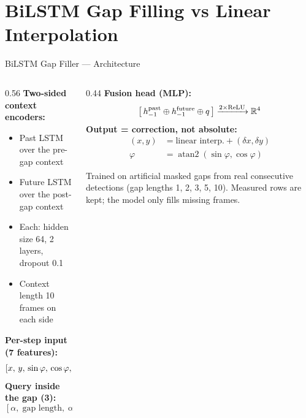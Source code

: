 
\section[BiLSTM Gap Filling]{BiLSTM Gap Filling vs Linear Interpolation}

\begin{frame}{BiLSTM Gap Filler --- Architecture}
\begin{columns}
\begin{column}{0.56\textwidth}
\textbf{Two-sided context encoders:}
\begin{itemize}\small
    \item Past LSTM over the pre-gap context
    \item Future LSTM over the post-gap context
    \item Each: hidden size 64, 2 layers, dropout 0.1
    \item Context length 10 frames on each side
\end{itemize}
\smallskip
\textbf{Per-step input (7 features):}
\begingroup\footnotesize
\begin{equation*}
    \left[x,\, y,\, \sin\varphi,\, \cos\varphi,\, \Delta x_{\rm prev},\, \Delta y_{\rm prev},\, \Delta t\right]
\end{equation*}
\endgroup
\textbf{Query inside the gap (3):}
\begingroup\footnotesize
\begin{equation*}
    \left[\alpha,\; \text{gap length},\; \text{offset}\right]
\end{equation*}
\endgroup
\end{column}
\begin{column}{0.44\textwidth}
\textbf{Fusion head (MLP):}
\begingroup\footnotesize
\begin{equation*}
    \big[\,h^{\rm past}_{-1} \oplus h^{\rm future}_{-1} \oplus q\,\big]
    \xrightarrow{\text{2$\times$ReLU}} \mathbb{R}^4
\end{equation*}
\endgroup
\textbf{Output = correction, not absolute:}
\begingroup\footnotesize
\begin{align*}
    (x,y) &= \text{linear interp.} + (\delta x, \delta y) \\
    \varphi &= \operatorname{atan2}(\sin\varphi, \cos\varphi)
\end{align*}
\endgroup
\begin{mynote}
\footnotesize Trained on artificial masked gaps from real consecutive detections (gap lengths 1, 2, 3, 5, 10). Measured rows are kept; the model only fills missing frames.
\end{mynote}
\end{column}
\end{columns}
\end{frame}

